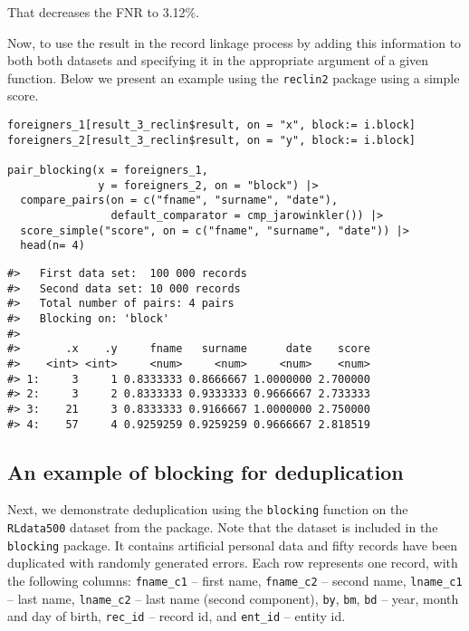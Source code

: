 That decreases the FNR to
3.12\%.

Now, to use the result in the record linkage process by adding this information to both both datasets
and specifying it in the appropriate argument of a given function. Below we present an example using the
\texttt{reclin2} package using a simple score.

\begin{verbatim}
foreigners_1[result_3_reclin$result, on = "x", block:= i.block]
foreigners_2[result_3_reclin$result, on = "y", block:= i.block]

pair_blocking(x = foreigners_1, 
              y = foreigners_2, on = "block") |>
  compare_pairs(on = c("fname", "surname", "date"),
                default_comparator = cmp_jarowinkler()) |>
  score_simple("score", on = c("fname", "surname", "date")) |>
  head(n= 4)
\end{verbatim}

\begin{verbatim}
#>   First data set:  100 000 records
#>   Second data set: 10 000 records
#>   Total number of pairs: 4 pairs
#>   Blocking on: 'block'
#> 
#>       .x    .y     fname   surname      date    score
#>    <int> <int>     <num>     <num>     <num>    <num>
#> 1:     3     1 0.8333333 0.8666667 1.0000000 2.700000
#> 2:     3     2 0.8333333 0.9333333 0.9666667 2.733333
#> 3:    21     3 0.8333333 0.9166667 1.0000000 2.750000
#> 4:    57     4 0.9259259 0.9259259 0.9666667 2.818519
\end{verbatim}

\subsection{An example of blocking for deduplication}\label{an-example-of-blocking-for-deduplication}

Next, we demonstrate deduplication using the \texttt{blocking} function on the
\texttt{RLdata500} dataset from the  package. Note that
the dataset is included in the \texttt{blocking} package. It contains
artificial personal data and fifty records have been duplicated with
randomly generated errors. Each row represents one record, with the
following columns: \texttt{fname\_c1} -- first name, \texttt{fname\_c2} -- second name,
\texttt{lname\_c1} -- last name, \texttt{lname\_c2} -- last name (second component),
\texttt{by}, \texttt{bm}, \texttt{bd} -- year, month and day of birth, \texttt{rec\_id} -- record id, and
\texttt{ent\_id} -- entity id.

